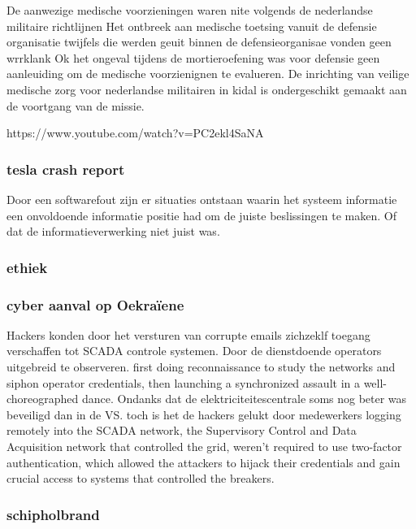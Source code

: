 De aanwezige medische voorzieningen waren nite volgends de nederlandse militaire richtlijnen
Het ontbreek aan medische toetsing vanuit de defensie organisatie
twijfels die werden geuit binnen de defensieorganisae vonden geen wrrklank
Ok het ongeval tijdens de mortieroefening was voor defensie geen aanleuiding om de medische voorzienignen te evalueren.
De inrichting van veilige medische zorg voor nederlandse militairen in kidal is ondergeschikt gemaakt aan de voortgang van de missie.


https://www.youtube.com/watch?v=PC2ekl4SaNA 
\subsubsection{tesla crash report}
Door een softwarefout zijn er situaties ontstaan waarin het systeem informatie een onvoldoende informatie positie had om de juiste beslissingen te maken. Of dat de informatieverwerking niet juist was.



\subsubsection{ethiek}


\subsubsection{ cyber aanval op Oekraïene }


Hackers konden door het versturen van corrupte emails zichzeklf toegang verschaffen tot  SCADA controle systemen. Door de dienstdoende operators uitgebreid te observeren.
first doing reconnaissance to study the networks and siphon operator credentials, then launching a synchronized assault in a well-choreographed dance.
Ondanks dat de elektriciteitescentrale soms nog beter was beveiligd dan in de VS. toch is het de hackers gelukt door medewerkers logging remotely into the SCADA network, the Supervisory Control and Data Acquisition network that controlled the grid, weren't required to use two-factor authentication, which allowed the attackers to hijack their credentials and gain crucial access to systems that controlled the breakers.





\subsubsection{schipholbrand}





